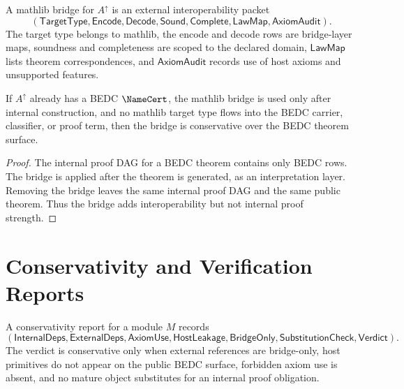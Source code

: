\begin{definition}
\label{def:mature-bridge-spine-mathlib-bridge}
A mathlib bridge for $A^{\uparrow}$ is an external interoperability packet
$$
(\mathsf{TargetType},\mathsf{Encode},\mathsf{Decode},
\mathsf{Sound},\mathsf{Complete},\mathsf{LawMap},\mathsf{AxiomAudit}).
$$
The target type belongs to mathlib, the encode and decode rows are
bridge-layer maps, soundness and completeness are scoped to the declared
domain, $\mathsf{LawMap}$ lists theorem correspondences, and
$\mathsf{AxiomAudit}$ records use of host axioms and unsupported features.
\end{definition}

\begin{theorem}
\label{thm:mature-bridge-spine-mathlib-conservativity}
If $A^{\uparrow}$ already has a BEDC $\NameCert$, the mathlib bridge is used
only after internal construction, and no mathlib target type flows into the
BEDC carrier, classifier, or proof term, then the bridge is conservative over
the BEDC theorem surface.
\end{theorem}

\begin{proof}
The internal proof DAG for a BEDC theorem contains only BEDC rows.  The bridge
is applied after the theorem is generated, as an interpretation layer.  Removing
the bridge leaves the same internal proof DAG and the same public theorem.
Thus the bridge adds interoperability but not internal proof strength.
\end{proof}

\section{Conservativity and Verification Reports}
\label{sec:mature-bridge-spine-reports}

\begin{definition}
\label{def:mature-bridge-spine-conservativity-report}
A conservativity report for a module $M$ records
$$
(\mathsf{InternalDeps},\mathsf{ExternalDeps},\mathsf{AxiomUse},
\mathsf{HostLeakage},\mathsf{BridgeOnly},
\mathsf{SubstitutionCheck},\mathsf{Verdict}).
$$
The verdict is conservative only when external references are bridge-only,
host primitives do not appear on the public BEDC surface, forbidden axiom use
is absent, and no mature object substitutes for an internal proof obligation.
\end{definition}

